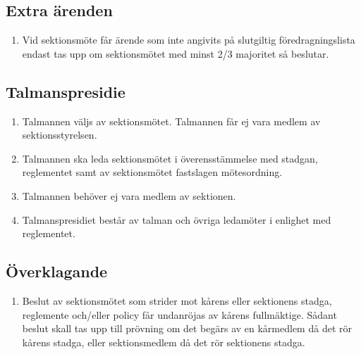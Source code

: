 \documentclass[11pt,a4paper]{article}
\begin{document}
\subsection{Extra ärenden}
\begin{enumerate}[\thesubsection.1]

  \item Vid sektionsmöte får ärende som inte angivits på slutgiltig
  före\-drag\-nings\-lista endast tas upp om sektionsmötet med minst 2/3 majoritet så beslutar.

\end{enumerate}

\subsection{Talmanspresidie}

\begin{enumerate}[\thesubsection.1]

  \item Talmannen väljs av sektionsmötet. Talmannen får ej vara medlem av sektionsstyrelsen.

  \item Talmannen ska leda sektionsmötet i överensstämmelse med
  st\-ad\-gan, reglementet samt av sektionsmötet fastslagen mötesordning.

\item Talmannen behöver ej vara medlem av sektionen.

\item Talmanspresidiet består av talman och övriga ledamöter i enlighet med reglementet.

\end{enumerate}

\subsection{Överklagande}

\begin{enumerate}[\thesubsection.1]

  \item Beslut av sektionsmötet som strider mot kårens eller
  sektionens stad\-ga, reglemente och/eller policy får undanröjas av
  kårens fullmäktige. Så\-dant beslut skall tas upp till prövning om det begärs av en kår\-med\-lem då det rör kårens stadga, eller
  sektionsmedlem då det rör sektion\-ens stadga.

\end{enumerate}
\end{document}
